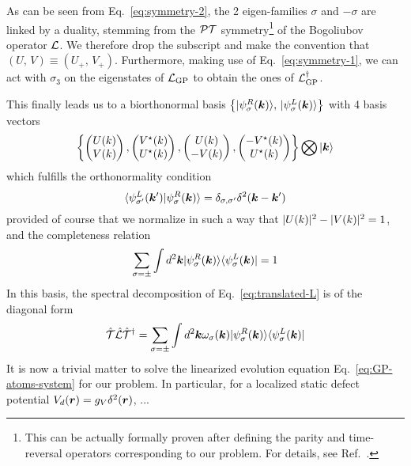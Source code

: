 As can be seen from Eq.~\eqref{eq:symmetry-2}, the 2 eigen-families
$\sigma$ and $-\sigma$ are linked by a duality, stemming from the
$\cal{P} \cal{T}$ symmetry\footnote{This can be actually formally
  proven after defining the parity and time-reversal operators
  corresponding to our problem. For details, see
  Ref.~\cite{MOSTAFAZADEH_2010}.} of the Bogoliubov operator $\mathcal{L}$.
We therefore drop the subscript and make the convention that
$\left( U,\, V \right) \equiv \left( U_{+},\, V_{+}
\right)$. Furthermore, making use of Eq.~\eqref{eq:symmetry-1}, we can
act with $\sigma_3$ on the eigenstates of $\mathcal{L}_{\text{GP}}$ to obtain
the ones of $\mathcal{L}_{\text{GP}}^{\dagger}$. 

This finally leads us to a biorthonormal basis
$\left\{ \vert \psi_\sigma^R(\bm{k}) \rangle,\, \vert \psi_\sigma^L(\bm{k}) \rangle \right\}$
with 4 basis vectors
%
\begin{equation}\label{eq:biorthobasis}
  \left\{ \begin{pmatrix} U(k)\\ V(k) \end{pmatrix}, \begin{pmatrix} V^{\star}(k)\\ U^{\star}(k) \end{pmatrix}, \begin{pmatrix} U(k)\\ -V(k) \end{pmatrix}, \begin{pmatrix} -V^{\star}(k)\\ U^{\star}(k) \end{pmatrix} \right\} \bigotimes \vert \bm{k} \rangle
\end{equation}
% 
which fulfills the orthonormality condition
%
\begin{equation}\label{eq:binormality}
  \langle \psi_{\sigma^{\prime}}^L(\bm{k}^{\prime}) \vert \psi_\sigma^R(\bm{k}) \rangle = \delta_{\sigma,\sigma^{\prime}} \delta^2(\bm{k} - \bm{k}^{\prime})
\end{equation}
% 
provided of course that we normalize in such a way that
$\vert U(k) \vert^2 - \vert V(k) \vert^2 = 1$, and the completeness relation
%
\begin{equation}\label{eq:bicompleteness}
  \sum_{\sigma = \pm} \int d^2 \bm{k} \vert \psi_\sigma^R(\bm{k}) \rangle\langle \psi_\sigma^L(\bm{k}) \vert = 1
\end{equation}
% 
In this basis, the spectral decomposition of
Eq.~\eqref{eq:translated-L} is of the diagonal form
%
\begin{equation}\label{eq:bidecomposition}
  \hat{{\cal T}} \hat{\mathcal{L}} \hat{{\cal T}}^{\dagger} = \sum_{\sigma = \pm} \int d^2 \bm{k} \omega_\sigma(\bm{k}) \vert \psi_\sigma^R(\bm{k}) \rangle\langle \psi_\sigma^L(\bm{k}) \vert
\end{equation}
% 
It is now a trivial matter to solve the linearized evolution equation
Eq.~\eqref{eq:GP-atoms-system} for our problem. In particular, for a
localized static defect potential $V_d(\bm{r}) = g_V \delta^2(\bm{r})$, ...





